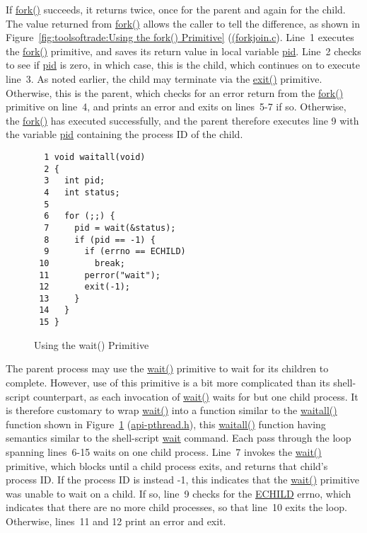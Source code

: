 If \url{fork()} succeeds, it returns twice, once for the parent
and again for the child.
The value returned from \url{fork()} allows the caller to tell
the difference, as shown in
Figure~\ref{fig:toolsoftrade:Using the fork() Primitive}
(\url{(forkjoin.c}).
Line~1 executes the \url{fork()} primitive, and saves its return value
in local variable \url{pid}.
Line~2 checks to see if \url{pid} is zero, in which case, this is the
child, which continues on to execute line~3.
As noted earlier, the child may terminate via the \url{exit()} primitive.
Otherwise, this is the parent, which checks for an error return from
the \url{fork()} primitive on line~4, and prints an error and exits
on lines~5-7 if so.
Otherwise, the \url{fork()} has executed successfully, and the parent
therefore executes line 9 with the variable \url{pid} containing the
process ID of the child.

\begin{figure}[tbp]
{ \scriptsize
\begin{verbatim}
  1 void waitall(void)
  2 {
  3   int pid;
  4   int status;
  5 
  6   for (;;) {
  7     pid = wait(&status);
  8     if (pid == -1) {
  9       if (errno == ECHILD)
 10         break;
 11       perror("wait");
 12       exit(-1);
 13     }
 14   }
 15 }
\end{verbatim}
}
\caption{Using the wait() Primitive}
\label{fig:toolsoftrade:Using the wait() Primitive}
\end{figure}

The parent process may use the \url{wait()} primitive to wait for its children
to complete.
However, use of this primitive is a bit more complicated than its shell-script
counterpart, as each invocation of \url{wait()} waits for but one child
process.
It is therefore customary to wrap \url{wait()} into a function similar
to the \url{waitall()} function shown in
Figure~\ref{fig:toolsoftrade:Using the wait() Primitive}
(\url{api-pthread.h}),
this \url{waitall()} function having semantics similar to the
shell-script \url{wait} command.
Each pass through the loop spanning lines~6-15 waits on one child process.
Line~7 invokes the \url{wait()} primitive, which blocks until a child process
exits, and returns that child's process ID.
If the process ID is instead -1, this indicates that the \url{wait()}
primitive was unable to wait on a child.
If so, line~9 checks for the \url{ECHILD} errno, which indicates that there
are no more child processes, so that line~10 exits the loop.
Otherwise, lines~11 and 12 print an error and exit.

